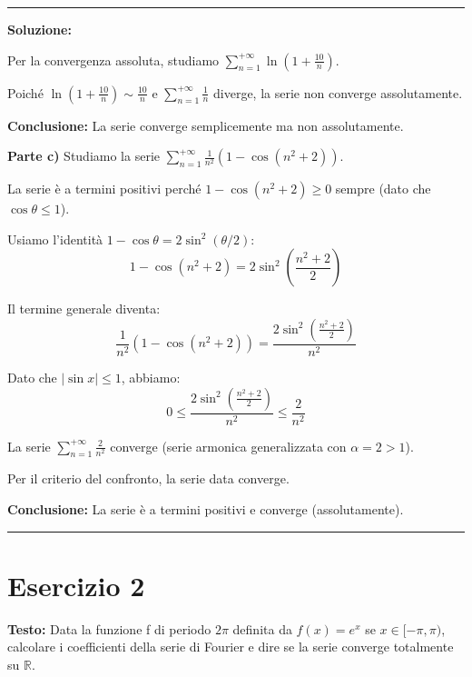 \documentclass[12pt, a4paper]{article}
\newenvironment{solution}
{\par\noindent\rule{\textwidth}{0.4pt}\par\textbf{Soluzione:}\medskip\par}
{\par\rule{\textwidth}{0.4pt}\par\bigskip}
\begin{document}
\begin{solution}
Per la convergenza assoluta, studiamo $\displaystyle\sum_{n=1}^{+\infty} \ln\left(1+\frac{10}{n}\right)$.

Poiché $\ln\left(1+\frac{10}{n}\right) \sim \frac{10}{n}$ e $\displaystyle\sum_{n=1}^{+\infty} \frac{1}{n}$ diverge, la serie non converge assolutamente.

\textbf{Conclusione:} La serie converge semplicemente ma non assolutamente.

\vspace{0.5cm}

\textbf{Parte c)} Studiamo la serie $\displaystyle\sum_{n=1}^{+\infty} \frac{1}{n^{2}}(1-\cos(n^{2}+2))$.

La serie è a termini positivi perché $1 - \cos(n^2 + 2) \geq 0$ sempre (dato che $\cos \theta \leq 1$).

Usiamo l'identità $1 - \cos \theta = 2\sin^2(\theta/2)$:
\[
1 - \cos(n^2 + 2) = 2\sin^2\left(\frac{n^2 + 2}{2}\right)
\]

Il termine generale diventa:
\[
\frac{1}{n^{2}}(1-\cos(n^{2}+2)) = \frac{2\sin^2\left(\frac{n^2 + 2}{2}\right)}{n^2}
\]

Dato che $|\sin x| \leq 1$, abbiamo:
\[
0 \leq \frac{2\sin^2\left(\frac{n^2 + 2}{2}\right)}{n^2} \leq \frac{2}{n^2}
\]

La serie $\displaystyle\sum_{n=1}^{+\infty} \frac{2}{n^2}$ converge (serie armonica generalizzata con $\alpha = 2 > 1$).

Per il criterio del confronto, la serie data converge.

\textbf{Conclusione:} La serie è a termini positivi e converge (assolutamente).
\end{solution}

\newpage

\section*{Esercizio 2}

\textbf{Testo:} Data la funzione f di periodo $2\pi$ definita da $f(x) = e^{x}$ se $x \in [-\pi, \pi)$, calcolare i coefficienti della serie di Fourier e dire se la serie converge totalmente su $\mathbb{R}$.
\end{document}
